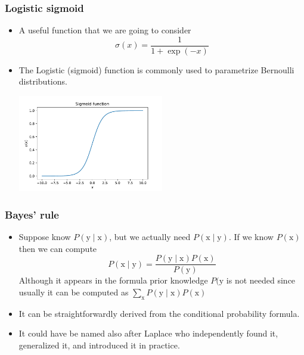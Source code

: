 \documentclass[notes]{beamer}          %
\begin{document}
\begin{frame}
\frametitle{Logistic sigmoid}
\begin{itemize}
    \item A useful function that we are going to consider
    $$\sigma(x) = \frac{1}{1 + \exp{(-x)}}$$
    \item The Logistic (sigmoid) function is commonly used to parametrize Bernoulli distributions.
    \begin{center}
    \includegraphics[width=0.5\textwidth]{figures/week_1/sigmoid.pdf}
    \end{center}

\end{itemize}
\end{frame}


\begin{frame}
\frametitle{Bayes' rule}
\begin{itemize}
    \item Suppose know $P(\text{y} \mid \text{x})$, but we actually need $P(\text{x} \mid \text{y})$. If we know $P(\text{x})$ then we can compute
    $$
        P(\text{x} \mid \text{y}) = \frac{P(\text{y} \mid \text{x})P(\text{x})}{P(\text{y})}
    $$
    Although it appears in the formula prior knowledge $P(\text{y}$ is not needed since usually it can be computed as $\sum_{\text{x}} P(\text{y} \mid \text{x})P(\text{x})$
    \item It can be straightforwardly derived from the conditional probability formula.
    \item It could have be named also after Laplace who independently found it, generalized it, and introduced it in practice.
\end{itemize}
\end{frame}
\end{document}
